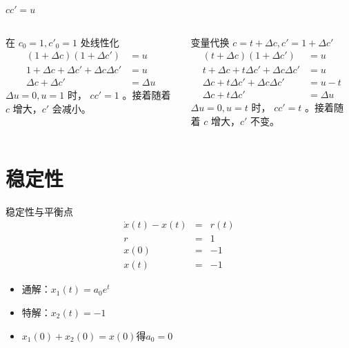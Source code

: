 \documentclass[presentation]{beamer}
\begin{document}
\begin{frame}[label={sec:org3f18657}]{\(cc'=u\)}
\begin{columns}
\begin{column}{0.5\columnwidth}
\begin{block}{在 \(c_0=1,c'_0=1\) 处线性化}
\begin{align*}
(1+\Delta c)(1+\Delta c') &= u \\
1+\Delta c+ \Delta c' + \Delta c \Delta c' &= u\\
\Delta c +\Delta c' &= \Delta u
\end{align*}
\(\Delta u=0,u=1\) 时， \(cc'=1\) 。接着随着 \(c\) 增大，\(c'\) 会减小。
\end{block}
\end{column}

\begin{column}{0.5\columnwidth}
\begin{block}{变量代换 \(c=t+\Delta c,c'=1+\Delta c'\)}
\begin{align*}
(t+\Delta c)(1+\Delta c') &=u \\
t+\Delta c+t\Delta c'+\Delta c\Delta c' &=u \\
\Delta c+t\Delta c'+\Delta c\Delta c' &=u-t \\
\Delta c +t\Delta c' &= \Delta u
\end{align*}
\(\Delta u=0,u=t\) 时， \(cc'=t\) 。接着随着 \(c\) 增大，\(c'\) 不变。
\end{block}
\end{column}
\end{columns}
\end{frame}
\section{稳定性}
\label{sec:orgc3b912b}
\begin{frame}[label={sec:org8718970}]{稳定性与平衡点}
\begin{eqnarray*}
\dot x(t)-x(t) & = & r(t)\\
r &=& 1 \\
x(0) &=& -1 \\
x(t) &=& -1
\end{eqnarray*}

\begin{itemize}
\item 通解：$x_1(t)=a_0e^t$
\item 特解：$x_2(t)=-1$
\item $x_1(0)+x_2(0)=x(0)$得$a_0=0$
\end{itemize}
\end{frame}
\end{document}
